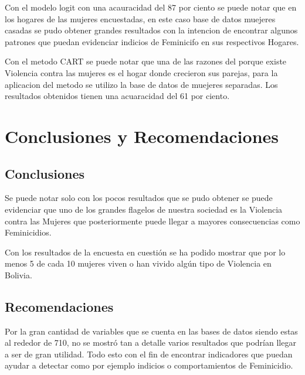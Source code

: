 \documentclass[11pt,letter]{article}
\begin{document}
Con el modelo logit con una acauracidad del 87 por ciento se puede notar que en los hogares de las mujeres encuestadas, en este caso base de datos muejeres casadas se pudo obtener grandes resultados con la intencion de encontrar algunos patrones que puedan evidenciar indicios de Feminicifo en sus respectivos Hogares.  

Con el metodo CART se puede notar que una de las razones del porque existe Violencia contra las mujeres es el hogar donde crecieron sus parejas, para la aplicacion del metodo se utilizo la base de datos de muejeres separadas. Los resultados obtenidos tienen una acuaracidad del 61 por ciento. 

\section{Conclusiones y Recomendaciones}

\subsection{Conclusiones}
Se puede notar solo con los pocos resultados que se pudo obtener se puede evidenciar que uno de los grandes flagelos de nuestra sociedad es la Violencia contra las Mujeres que posteriormente puede llegar a mayores consecuencias como Feminicidios. 

Con los resultados de la encuesta en cuestión se ha podido mostrar que por lo menos 5 de cada 10 mujeres viven o han vivido algún tipo de Violencia en Bolivia.

\subsection{Recomendaciones}
Por la gran cantidad de variables que se cuenta en las bases de datos siendo estas al rededor de 710, no se mostró tan a detalle varios resultados que podrían llegar a ser de gran utilidad. Todo esto con el fin de encontrar indicadores que puedan ayudar a detectar como por ejemplo indicios o comportamientos de Feminicidio.


 

\printbibliography
\end{document}
